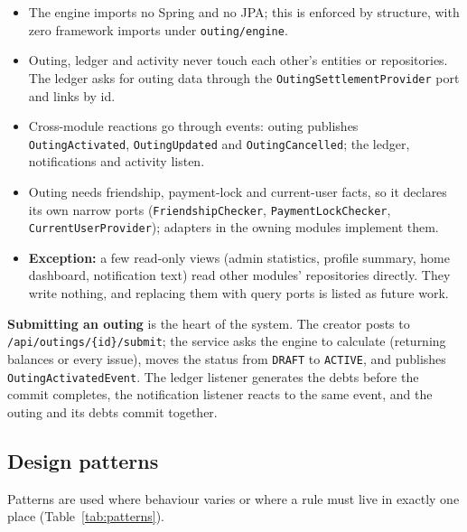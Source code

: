 \documentclass[10pt,a4paper]{article}
\newcommand{\code}[1]{\texttt{#1}}
\begin{document}
\begin{itemize}
\item The engine imports no Spring and no JPA; this is enforced by structure, with zero framework imports under
  \code{outing/engine}.
\item Outing, ledger and activity never touch each other's entities or repositories. The ledger asks for outing data
  through the \code{OutingSettlementProvider} port and links by id.
\item Cross-module reactions go through events: outing publishes \code{OutingActivated}, \code{OutingUpdated} and
  \code{OutingCancelled}; the ledger, notifications and activity listen.
\item Outing needs friendship, payment-lock and current-user facts, so it declares its own narrow ports
  (\code{FriendshipChecker}, \code{PaymentLockChecker}, \code{CurrentUserProvider}); adapters in the owning modules
  implement them.
\item \textbf{Exception:} a few read-only views (admin statistics, profile summary, home dashboard, notification text)
  read other modules' repositories directly. They write nothing, and replacing them with query ports is listed as
  future work.
\end{itemize}

\textbf{Submitting an outing} is the heart of the system. The creator posts to \code{/api/outings/\{id\}/submit}; the
service asks the engine to calculate (returning balances or every issue), moves the status from \code{DRAFT} to
\code{ACTIVE}, and publishes \code{OutingActivatedEvent}. The ledger listener generates the debts before the commit
completes, the notification listener reacts to the same event, and the outing and its debts commit together.

\subsection{Design patterns}

Patterns are used where behaviour varies or where a rule must live in exactly one place (Table~\ref{tab:patterns}).
\end{document}
